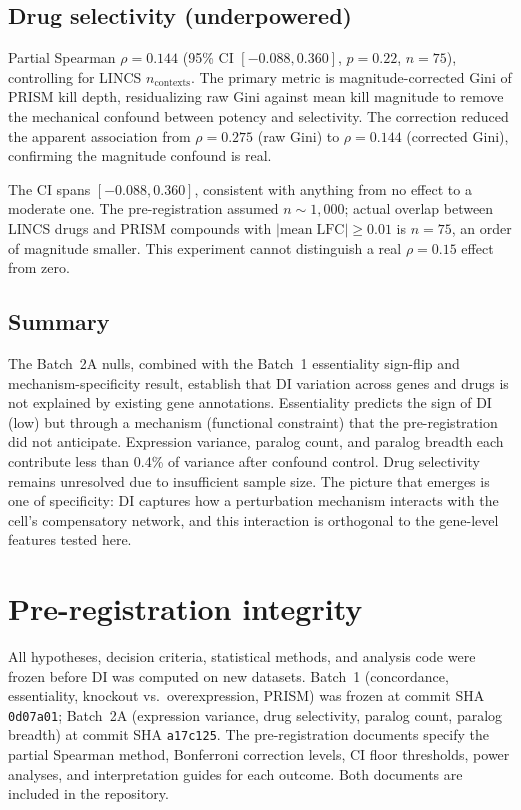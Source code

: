 \documentclass[11pt]{article}
\begin{document}
\subsection{Drug selectivity (underpowered)}

Partial Spearman $\rho = 0.144$ (95\% CI $[-0.088, 0.360]$,
$p = 0.22$, $n = 75$), controlling for LINCS $n_{\mathrm{contexts}}$.
The primary metric is magnitude-corrected Gini of PRISM kill depth,
residualizing raw Gini against mean kill magnitude to remove the
mechanical confound between potency and selectivity.  The correction
reduced the apparent association from $\rho = 0.275$ (raw Gini) to
$\rho = 0.144$ (corrected Gini), confirming the magnitude confound is
real.

The CI spans $[-0.088, 0.360]$, consistent with anything from no effect
to a moderate one.  The pre-registration assumed $n \sim 1{,}000$;
actual overlap between LINCS drugs and PRISM compounds with
$|\mathrm{mean\;LFC}| \geq 0.01$ is $n = 75$, an order of magnitude
smaller.  This experiment cannot distinguish a real $\rho = 0.15$ effect
from zero.


\subsection{Summary}

The Batch~2A nulls, combined with the Batch~1 essentiality sign-flip
and mechanism-specificity result, establish that DI variation across
genes and drugs is not explained by existing gene annotations.
Essentiality predicts the sign of DI (low) but through a mechanism
(functional constraint) that the pre-registration did not anticipate.
Expression variance, paralog count, and paralog breadth each contribute
less than 0.4\% of variance after confound control.  Drug selectivity
remains unresolved due to insufficient sample size.  The picture that
emerges is one of specificity: DI captures how a perturbation mechanism
interacts with the cell's compensatory network, and this interaction is
orthogonal to the gene-level features tested here.


\section{Pre-registration integrity}
\label{sec:integrity}

All hypotheses, decision criteria, statistical methods, and analysis
code were frozen before DI was computed on new datasets.  Batch~1
(concordance, essentiality, knockout vs.\ overexpression, PRISM) was
frozen at commit SHA \texttt{0d07a01}; Batch~2A (expression variance,
drug selectivity, paralog count, paralog breadth) at commit SHA
\texttt{a17c125}.  The pre-registration documents specify the
partial Spearman method, Bonferroni correction levels, CI floor
thresholds, power analyses, and interpretation guides for each outcome.
Both documents are included in the repository.
\end{document}
